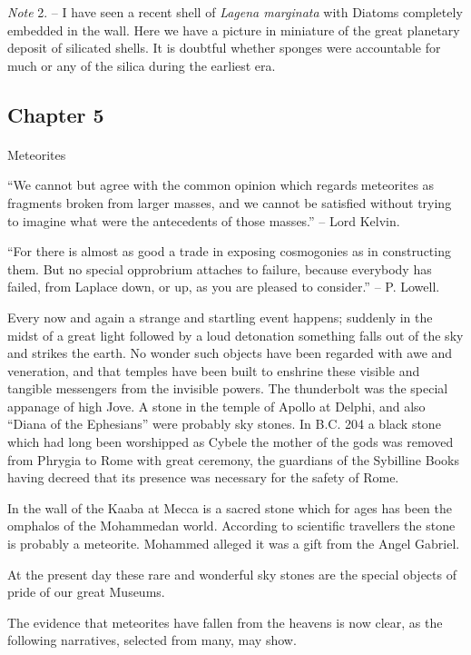 \documentclass[a4paper, 12pt, oneside]{article}
\begin{document}
\emph{Note} 2. -- I have seen a recent shell of \emph{Lagena marginata} with Diatoms completely embedded in the wall. Here we have a picture in miniature of the great planetary deposit of silicated shells. It is doubtful whether sponges were accountable for much or any of the silica during the earliest era.
\clearpage
\subsection{Chapter 5}
\paragraph{}
Meteorites

``We cannot but agree with the common opinion which regards meteorites as fragments broken from larger masses, and we cannot be satisfied without trying to imagine what were the antecedents of those masses.'' -- Lord Kelvin.

``For there is almost as good a trade in exposing cosmogonies as in constructing them. But no special opprobrium attaches to failure, because everybody has failed, from Laplace down, or up, as you are pleased to consider.'' -- P. Lowell.

Every now and again a strange and startling event happens; suddenly in the midst of a great light followed by a loud detonation something falls out of the sky and strikes the earth. No wonder such objects have been regarded with awe and veneration, and that temples have been built to enshrine these visible and tangible messengers from the invisible powers. The thunderbolt was the special appanage of high Jove. A stone in the temple of Apollo at Delphi, and also ``Diana of the Ephesians'' were probably sky stones. In B.C. 204 a black stone which had long been worshipped as Cybele the mother of the gods was removed from Phrygia to Rome with great ceremony, the guardians of the Sybilline Books having decreed that its presence was necessary for the safety of Rome.

In the wall of the Kaaba at Mecca is a sacred stone which for ages has been the omphalos of the Mohammedan world. According to scientific travellers the stone is probably a meteorite. Mohammed alleged it was a gift from the Angel Gabriel.

At the present day these rare and wonderful sky stones are the special objects of pride of our great Museums.

The evidence that meteorites have fallen from the heavens is now clear, as the following narratives, selected from many, may show.
\end{document}
